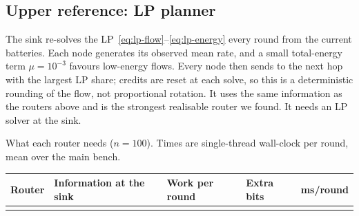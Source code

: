 \subsection{Upper reference: LP planner}\label{sec:lp-planner}
The sink re-solves the LP~\eqref{eq:lp-flow}--\eqref{eq:lp-energy} every round from the current batteries. Each node generates its observed mean rate, and a small total-energy term $\mu=10^{-3}$ favours low-energy flows. Every node then sends to the next hop with the largest LP share; credits are reset at each solve, so this is a deterministic rounding of the flow, not proportional rotation. It uses the same information as the routers above and is the strongest realisable router we found. It needs an LP solver at the sink.

\begin{widetab}
\centering
\caption{What each router needs ($n=100$). Times are single-thread wall-clock per round, mean over the main bench.}\label{tab:characteristics}
\footnotesize
\begin{adjustbox}{max width=\linewidth}
\begin{tabular}{@{}L{0.25\textwidth}L{0.24\textwidth}L{0.22\textwidth}L{0.12\textwidth}r@{}}
\toprule
Router & Information at the sink & Work per round & Extra bits & ms/round\\
\midrule
{}
\bottomrule
\end{tabular}
\end{adjustbox}
\end{widetab}
